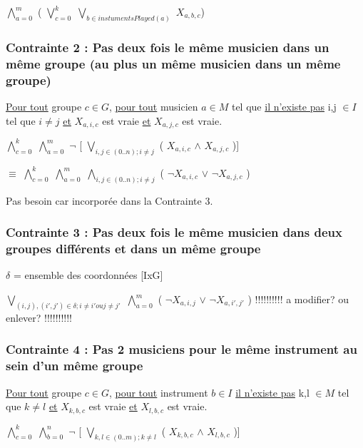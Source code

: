 \documentclass[a4paper,10pt]{report}
\begin{document}
$\bigwedge \limits_{a=0}^{m}$ ( $\bigvee \limits_{c=0}^{k}$ $\bigvee \limits_{b \in instumentsPlayed(a) }$  $X_{a,b,c}$)



\subsubsection{Contrainte 2 : Pas deux fois le même musicien dans un même groupe (au plus un même musicien dans un même groupe)}


\underline{Pour tout} groupe $c \in G$, \underline{pour tout} musicien $a \in M $ tel que \underline{il n'existe pas} i,j $\in I$  tel que $i \neq j$ \underline{et} $X_{a,i,c}$ est vraie
\underline{et} $X_{a,j,c}$ est vraie.


$\bigwedge \limits_{c=0}^{k}$ $\bigwedge \limits_{a=0}^{m}$ $\neg$ [ $\bigvee \limits_{i,j \in (0..n); i\neq j}$ ( $X_{a,i,c}$ $\wedge$ $X_{a,j,c}$ )]


$\equiv$ $\bigwedge \limits_{c=0}^{k}$ $\bigwedge \limits_{a=0}^{m}$  $\bigwedge \limits_{i,j \in (0..n); i\neq j}$ ( $\neg X_{a,i,c}$ $\vee $ $ \neg X_{a,j,c}$ )


Pas besoin car incorporée dans la Contrainte 3.

\subsubsection{Contrainte 3 : Pas deux fois le même musicien dans deux groupes différents et dans un même groupe}

$\delta$ = ensemble des coordonnées [IxG]

 $\bigvee \limits_{(i,j), (i',j') \in \delta ; i\neq i' ou j\neq j'}$ $\bigwedge \limits_{a=0}^{m}$ ( $\neg X_{a,i,j}$ $\vee $ $ \neg X_{a,i',j'}$ )
!!!!!!!!!! a modifier? ou enlever? !!!!!!!!!!

\subsubsection{Contrainte 4 : Pas 2 musiciens pour le même instrument au sein d'un même groupe}
 
\underline{Pour tout} groupe $c \in G$, \underline{pour tout} instrument $b \in I$ \underline{il n'existe pas} k,l $\in M$  tel que $k \neq l$ \underline{et} $X_{k,b,c}$ est vraie
\underline{et} $X_{l,b,c}$ est vraie. 
 
$\bigwedge \limits_{c=0}^{k}$ $\bigwedge \limits_{b=0}^{n}$ $\neg$ [ $\bigvee \limits_{k,l \in (0..m); k\neq l}$ ( $X_{k,b,c}$ $\wedge$ $X_{l,b,c}$ )]
\end{document}
